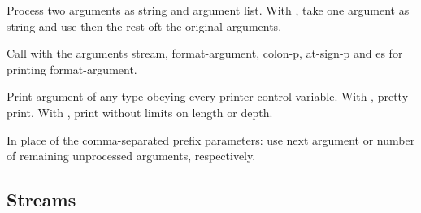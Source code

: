 \begin{LIST}{1cm}
\begin{LIST}{.5cm}
    {
    Process two arguments as  string and argument list. With
    , take one argument as  string and use then the
    rest oft the original arguments.
  }

    {
    Call  with the arguments stream, format-ar\-gu\-ment,
    colon-p, at-sign-p and es for printing format-argument.
  }

    {
    Print argument of any type obeying every printer control variable. With \kwd{:},
    pretty-print. With , print without limits on length or depth.
  }

    {\index{\#}
    In place of the comma-separated prefix parameters: use next
    argument or number of remaining unprocessed arguments, respectively.
  }

  \end{LIST}

\end{LIST}


\subsection{Streams} 

